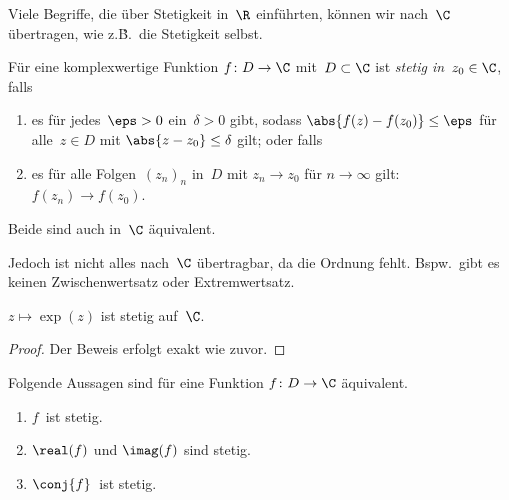 \documentclass[a4paper]{article}
\begin{document}
Viele Begriffe, die über Stetigkeit in~$\R$ einführten, können wir nach~$\C$ übertragen, wie z.\.B.\ die Stetigkeit selbst.

\begin{definition}[Stetigkeit in~$\C$]
    Für eine komplexwertige Funktion $f\colon D \to \C$ mit~$D \subset \C$ ist \emph{stetig in~$z_0 \in \C$}, falls
    \begin{enumerate}
        \item es für jedes~$\eps > 0$ ein~$\delta > 0$ gibt, sodass $\abs{f(z)-f(z_0)} \leq \eps$ für alle~$z \in D$ mit $\abs{z-z_0} \leq \delta$ gilt; oder falls
        \item es für alle Folgen~$(z_n)_n$ in~$D$ mit $z_n \to z_0$ für $n \to \infty$ gilt: $f(z_n) \to f(z_0)$.
    \end{enumerate}
    Beide sind auch in~$\C$ äquivalent.
\end{definition}

\begin{center}
\end{center}

Jedoch ist nicht alles nach~$\C$ übertragbar, da die Ordnung fehlt. Bspw.\ gibt es keinen Zwischenwertsatz oder Extremwertsatz.

\begin{proposition}
    $z \mapsto \exp(z)$ ist stetig auf~$\C$.
\end{proposition}

\begin{proof}
    Der Beweis erfolgt exakt wie zuvor.
\end{proof}

\begin{proposition}
    Folgende Aussagen sind für eine Funktion $f\colon D \to \C$ äquivalent.
    \begin{enumerate}
        \item $f$~ist stetig.\label{prop:continuity:complex:1}
        \item $\real(f)$ und $\imag(f)$ sind stetig.\label{prop:continuity:complex:2}
        \item $\conj{f}$~ist stetig.\label{prop:continuity:complex:3}
    \end{enumerate}
\end{proposition}
\end{document}
